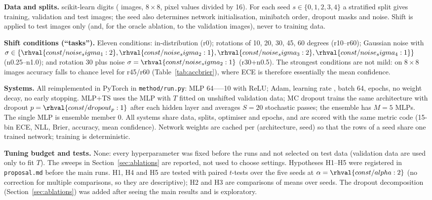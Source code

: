 \textbf{Data and splits.} scikit-learn digits ( images, $8{\times}8$, pixel values divided by 16). For each seed $s\in\{0,1,2,3,4\}$ a stratified split gives  training,  validation and  test images; the seed also determines network initialisation, minibatch order, dropout masks and noise. Shift is applied to test images only (and, for the oracle ablation, to the validation images), never to training data.

\textbf{Shift conditions (``tasks'').} Eleven conditions: in-distribution (r0); rotations of 10, 20, 30, 45, 60 degrees (r10--r60); Gaussian noise with $\sigma\in\{\rhval{const/noise_sigma_1:2},\rhval{const/noise_sigma_2:1},\rhval{const/noise_sigma_3:2},\rhval{const/noise_sigma_4:1}\}$ (n0.25--n1.0); and rotation 30 plus noise $\sigma=\rhval{const/noise_sigma_2:1}$ (r30+n0.5). The strongest conditions are not mild: on $8{\times}8$ images accuracy falls to chance level for r45/r60 (Table~\ref{tab:accbrier}), where ECE is therefore essentially the mean confidence.

\textbf{Systems.} All reimplemented in PyTorch in \texttt{method/run.py}: MLP 64------10 with ReLU; Adam, learning rate , batch 64,  epochs, no weight decay, no early stopping. MLP+TS uses the MLP with $T$ fitted on unshifted validation data; MC dropout trains the same architecture with dropout $p=\rhval{const/dropout_p:1}$ after each hidden layer and averages $S=20$ stochastic passes; the ensemble has $M=5$ MLPs. The single MLP is ensemble member 0. All systems share data, splits, optimiser and epochs, and are scored with the same metric code (15-bin ECE, NLL, Brier, accuracy, mean confidence). Network weights are cached per (architecture, seed) so that the rows of a seed share one trained network; training is deterministic.

\textbf{Tuning budget and tests.} None: every hyperparameter was fixed before the runs and not selected on test data (validation data are used only to fit $T$). The sweeps in Section~\ref{sec:ablations} are reported, not used to choose settings. Hypotheses H1--H5 were registered in \texttt{proposal.md} before the main runs. H1, H4 and H5 are tested with paired $t$-tests over the five seeds at $\alpha=\rhval{const/alpha:2}$ (no correction for multiple comparisons, so they are descriptive); H2 and H3 are comparisons of means over seeds. The dropout decomposition (Section~\ref{sec:ablations}) was added after seeing the main results and is exploratory.

